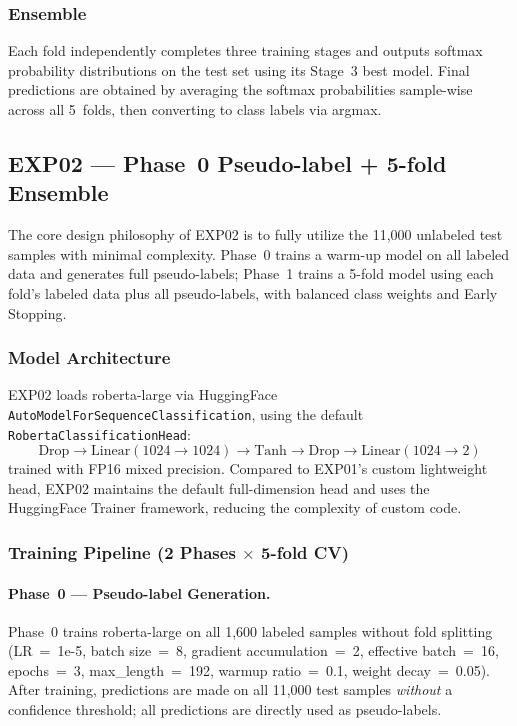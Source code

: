 \documentclass[10pt,twocolumn]{article}
\begin{document}
\subsubsection{Ensemble}
Each fold independently completes three training stages and outputs
softmax probability distributions on the test set using its Stage~3
best model. Final predictions are obtained by averaging the softmax
probabilities sample-wise across all 5~folds, then converting to class
labels via argmax.

\subsection{EXP02 --- Phase~0 Pseudo-label + 5-fold Ensemble}

The core design philosophy of EXP02 is to fully utilize the 11,000
unlabeled test samples with minimal complexity. Phase~0 trains a
warm-up model on all labeled data and generates full pseudo-labels;
Phase~1 trains a 5-fold model using each fold's labeled data plus all
pseudo-labels, with balanced class weights and Early Stopping.

\subsubsection{Model Architecture}
EXP02 loads roberta-large via HuggingFace
\texttt{AutoModelForSequenceClassification}, using the default
\texttt{RobertaClassificationHead}:
\[
  \text{Drop} \to \text{Linear}(1024{\to}1024) \to \text{Tanh}
  \to \text{Drop} \to \text{Linear}(1024{\to}2)
\]
trained with FP16 mixed precision. Compared to EXP01's custom
lightweight head, EXP02 maintains the default full-dimension head and
uses the HuggingFace Trainer framework, reducing the complexity of
custom code.

\subsubsection{Training Pipeline (2 Phases $\times$ 5-fold CV)}

\paragraph{Phase~0 --- Pseudo-label Generation.}
Phase~0 trains roberta-large on all 1,600 labeled samples without fold
splitting (LR~=~1e-5, batch size~=~8, gradient accumulation~=~2,
effective batch~=~16, epochs~=~3, max\_length~=~192, warmup
ratio~=~0.1, weight decay~=~0.05). After training, predictions are made
on all 11,000 test samples \emph{without} a confidence threshold; all
predictions are directly used as pseudo-labels.
\end{document}
